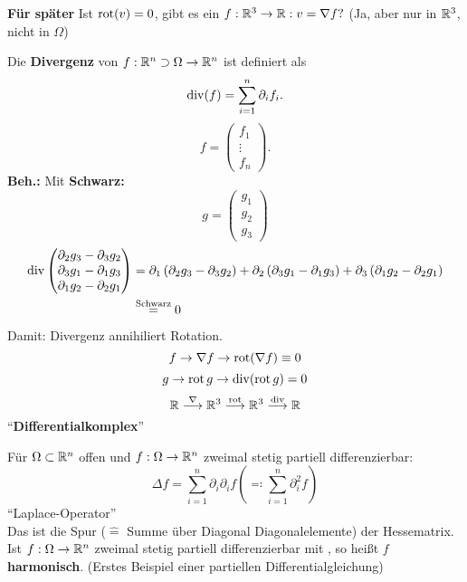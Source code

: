 \begin{lemma*}
	\textbf{Für später} Ist $ \operatorname{rot}(v) = 0 $, gibt es ein $ f : \mathbb{R} ^3 \to \mathbb{R} : v = \nabla f ? $ (Ja, aber nur in $ \mathbb{R} ^3 $, nicht in $ \Omega $)
\end{lemma*}

\begin{example}
	Die \textbf{Divergenz} von $ f: \mathbb{R} ^n \supset \Omega \to \mathbb{R} ^n $ ist definiert als
	\[
		\operatorname{div} (f) = \sum_{i=1}^{n} \partial_i f_i.
	\]
	\[
		f = \begin{pmatrix} f_1 \\ \vdots \\ f_n \end{pmatrix} .
	\]
	\textbf{Beh.:}  Mit \textbf{Schwarz:}
	\[
		g =
		\begin{pmatrix} 
			g_1 \\ g_2 \\ g_3
		\end{pmatrix}
	\]
	\begin{align*}
		\operatorname{div}
		\begin{pmatrix} 
			\partial_2 g_3 - \partial_3 g_2 \\
			\partial_3 g_1 - \partial_1 g_3 \\
			\partial_1 g_2 - \partial_2 g_1 \\
		\end{pmatrix} 
		  &= \partial_1 \left( \partial_2 g_3 - \partial_3 g_2 \right) 
		  + \partial_2 \left( \partial_3 g_1 - \partial_1 g_3 \right) 
		  + \partial_3 \left( \partial_1 g_2 - \partial_2 g_1 \right) \\
		  &\overset{\text{Schwarz} }{=} 0
	\end{align*}
	Damit: Divergenz annihiliert Rotation.
	\[
		f \to \nabla f \to \operatorname{rot}( \nabla f ) \equiv 0
	\]
	\[
		g \to \operatorname{rot} g \to \operatorname{div}( \operatorname{rot} g ) = 0
	\]
	\[
		\mathbb{R} \overset{\nabla }{\longrightarrow} \mathbb{R} ^3 \overset{\operatorname{rot}}{\longrightarrow} \mathbb{R} ^3 \overset{\operatorname{div}}{\longrightarrow} \mathbb{R} 
	\]
	``\textbf{Differentialkomplex}''
\end{example}

\begin{example}
	Für $ \Omega \subset \mathbb{R} ^n $ offen und $ f : \Omega \to \mathbb{R} ^n $ zweimal stetig partiell differenzierbar:
	\[
		\Delta f = \sum_{i=1}^{n} \partial_i \partial_i f \left( \eqcolon \sum_{i=1}^{n} \partial_i^2 f \right) 
	\]
	``Laplace-Operator''\\
	Das ist die Spur ($ \hat{=}  $ Summe über Diagonal  Diagonalelemente) der Hessematrix.
	Ist $ f : \Omega \to \mathbb{R} ^n $ zweimal stetig partiell differenzierbar mit , so heißt $ f $ \textbf{harmonisch}.
	(Erstes Beispiel einer partiellen Differentialgleichung)
	
\end{example}

